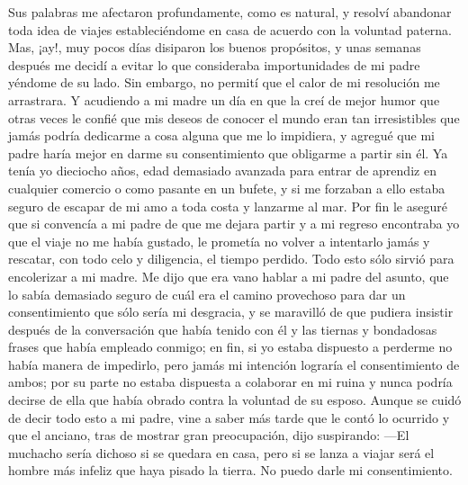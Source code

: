 \documentclass{novela}
\begin{document}
    Sus palabras me afectaron profundamente, como es natural, y resolví abandonar toda idea de viajes estableciéndome en casa de acuerdo con la voluntad paterna. Mas, ¡ay!, muy pocos días disiparon los buenos propósitos, y unas semanas después me decidí a evitar lo que consideraba importunidades de mi padre yéndome de su lado. Sin embargo, no permití que el calor de mi resolución me arrastrara. Y acudiendo a mi madre un día en que la creí de mejor humor que otras veces le confié que mis deseos de conocer el mundo eran tan irresistibles que jamás podría dedicarme a cosa alguna que me lo impidiera, y agregué que mi padre haría mejor en darme su consentimiento que obligarme a partir sin él. Ya tenía yo dieciocho años, edad demasiado avanzada para entrar de aprendiz en cualquier comercio o como pasante en un bufete, y si me forzaban a ello estaba seguro de escapar de mi amo a toda costa y lanzarme al mar. Por fin le aseguré que si convencía a mi padre de que me dejara partir y a mi regreso encontraba yo que el viaje no me había gustado, le prometía no volver a intentarlo jamás y rescatar, con todo celo y diligencia, el tiempo perdido.
    Todo esto sólo sirvió para encolerizar a mi madre. Me dijo que era vano hablar a mi padre del asunto, que lo sabía demasiado seguro de cuál era el camino provechoso para dar un consentimiento que sólo sería mi desgracia, y se maravilló de que pudiera insistir después de la conversación que había tenido con él y las tiernas y bondadosas frases que había empleado conmigo; en fin, si yo estaba dispuesto a perderme no había manera de impedirlo, pero jamás mi intención lograría el consentimiento de ambos; por su parte no estaba dispuesta a colaborar en mi ruina y nunca podría decirse de ella que había obrado contra la voluntad de su esposo.
    Aunque se cuidó de decir todo esto a mi padre, vine a saber más tarde que le contó lo ocurrido y que el anciano, tras de mostrar gran preocupación, dijo suspirando:
    —El muchacho sería dichoso si se quedara en casa, pero si se lanza a viajar será el hombre más infeliz que haya pisado la tierra. No puedo darle mi consentimiento.
\end{document}
